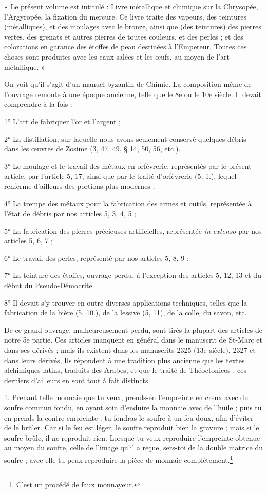 \documentclass[a4paper, 11pt, oneside, polutonikogreek, french]{article}
\begin{document}
« Le présent volume est intitulé : Livre métallique et chimique sur la Chrysopée, l'Argyropée, la fixation du mercure. Ce livre traite des vapeurs, des teintures (métalliques), et des moulages avec le bronze, ainsi que (des teintures) des pierres vertes, des grenats et autres pierres de toutes couleurs, et des perles ; et des colorations en garance des étoffes de peau destinées à l'Empereur. Toutes ces choses sont produites avec les eaux salées et les œufs, au moyen de l'art métallique. »

On voit qu'il s'agit d'un manuel byzantin de Chimie. La composition même de l'ouvrage remonte à une époque ancienne, telle que le 8e ou le 10e siècle. Il devait comprendre à la fois :

1° L'art de fabriquer l'or et l'argent ;

2° La distillation, sur laquelle nous avons seulement conservé quelques débris dans les œuvres de Zosime (3, 47, 49, § 14, 50, 56, etc.).

3° Le moulage et le travail des métaux en orfèvrerie, représentés par le présent article, par l'article 5, 17, ainsi que par le traité d'orfèvrerie (5, 1.), lequel renferme d'ailleurs des portions plus modernes ;

4° La trempe des métaux pour la fabrication des armes et outils, représentée à l'état de débris par nos articles 5, 3, 4, 5 ;

5° La fabrication des pierres précieuses artificielles, représentée \emph{in extenso} par nos articles 5, 6, 7 ;

6° Le travail des perles, représenté par nos articles 5, 8, 9 ;

7° La teinture des étoffes, ouvrage perdu, à l'exception des articles 5, 12, 13 et du début du Pseudo-Démocrite.

8° Il devait s'y trouver en outre diverses applications techniques, telles que la fabrication de la bière (5, 10.), de la lessive (5, 11), de la colle, du savon, etc.

De ce grand ouvrage, malheureusement perdu, sont tirés la plupart des articles de notre 5e partie. Ces articles manquent en général dans le manuscrit de St-Marc et dans ses dérivés ; mais ils existent dans les manuscrits 2325 (13e siècle), 2327 et dans leurs dérivés, Ils répondent à une tradition plus ancienne que les textes alchimiques latins, traduits des Arabes, et que le traité de Théoctonicos ; ces derniers d'ailleurs en sont tout à fait distincts.

1. Prenant telle monnaie que tu veux, prends-en l'empreinte en creux avec du soufre commun fondu, en ayant soin d'enduire la monnaie avec de l'huile ; puis tu en prends la contre-empreinte : tu fondras le soufre à un feu doux, afin d'éviter de le brûler. Car si le feu est léger, le soufre reproduit bien la gravure ; mais si le soufre brûle, il ne reproduit rien. Lorsque tu veux reproduire l'empreinte obtenue au moyen du soufre, celle de l'image qu'il a reçue, sers-toi de la double matrice du soufre ; avec elle tu peux reproduire la pièce de monnaie complètement.\footnote{C'est un procédé de faux monnayeur.}
\end{document}
